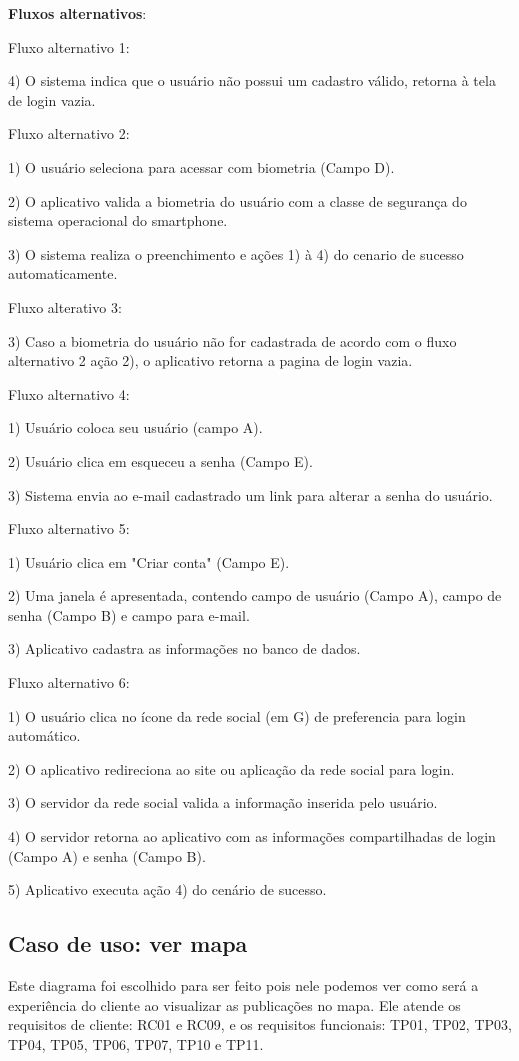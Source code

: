 \documentclass[12pt]{article}
\begin{document}
\textbf{Fluxos alternativos}:

Fluxo alternativo 1:

4) O sistema indica que o usuário não possui um cadastro válido, retorna à tela de login vazia.

Fluxo alternativo 2:

1) O usuário seleciona para acessar com biometria (Campo D). 

2) O aplicativo valida a biometria do usuário com a classe de segurança do sistema operacional do smartphone.

3) O sistema realiza o preenchimento e ações 1) à 4) do cenario de sucesso automaticamente.

Fluxo alterativo 3:

3) Caso a biometria do usuário não for cadastrada de acordo com o fluxo alternativo 2 ação 2), o aplicativo retorna a pagina de login vazia.

Fluxo alternativo 4:

1) Usuário coloca seu usuário (campo A).

2) Usuário clica em esqueceu a senha (Campo E).

3) Sistema envia ao e-mail cadastrado um link para alterar a senha do usuário.

Fluxo alternativo 5:

1) Usuário clica em "Criar conta" (Campo E).

2) Uma janela é apresentada, contendo campo de usuário (Campo A), campo de senha (Campo B) e campo para e-mail.

3) Aplicativo cadastra as informações no banco de dados.

Fluxo alternativo 6:

1) O usuário clica no ícone da rede social (em G) de preferencia para login automático.

2) O aplicativo redireciona ao site ou aplicação da rede social para login.

3) O servidor da rede social valida a informação inserida pelo usuário.

4) O servidor retorna ao aplicativo com as informações compartilhadas de login (Campo A) e senha (Campo B).

5) Aplicativo executa ação 4) do cenário de sucesso.

\vfill%
\pagebreak%

\subsection{Caso de uso: ver mapa}
Este diagrama foi escolhido para ser feito pois nele podemos ver como será a experiência do cliente ao visualizar as publicações no mapa. Ele atende os requisitos de cliente: RC01 e RC09, e os requisitos funcionais: TP01, TP02, TP03, TP04, TP05, TP06, TP07, TP10 e TP11.
\end{document}
